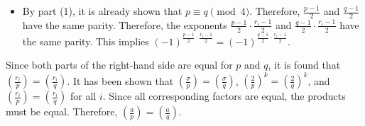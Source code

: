 \begin{enumerate}
\begin{subprove}
\begin{itemize}
        By the periodicity of the Legendre symbol in its top argument, $\left(\frac{p}{r_i}\right) = \left(\frac{q}{r_i}\right)$.
        \item 
        By part (1), it is already shown that $p \equiv q \pmod 4$.
        Therefore, $\frac{p-1}{2}$ and $\frac{q-1}{2}$ have the same parity.
        Therefore, the exponents $\frac{p-1}{2} \cdot \frac{r_i-1}{2}$ and $\frac{q-1}{2} \cdot \frac{r_i-1}{2}$ have the same parity.
        This implies $(-1)^{\frac{p-1}{2} \cdot \frac{r_i-1}{2}} = (-1)^{\frac{q-1}{2} \cdot \frac{r_i-1}{2}}$.
    \end{itemize}
    Since both parts of the right-hand side are equal for $p$ and $q$, it is found that $\left(\frac{r_i}{p}\right) = \left(\frac{r_i}{q}\right)$.
    It has been shown that $\left(\frac{\sigma}{p}\right) = \left(\frac{\sigma}{q}\right)$, $\left(\frac{2}{p}\right)^k = \left(\frac{2}{q}\right)^k$, and $\left(\frac{r_i}{p}\right) = \left(\frac{r_i}{q}\right)$ for all $i$.
    Since all corresponding factors are equal, the products must be equal.
    Therefore, $\left(\frac{a}{p}\right)=\left(\frac{a}{q}\right)$.
  \end{subprove}






\end{enumerate}
